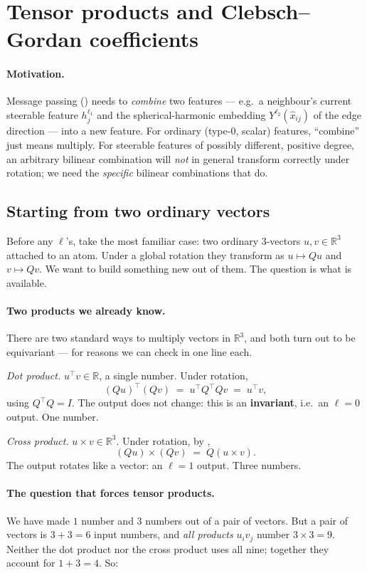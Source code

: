 \documentclass[11pt,a4paper]{report}
\theoremstyle{definition}
\theoremstyle{remark}
\newcommand{\RR}{\mathbb R}
\begin{document}
\section{Tensor products and Clebsch--Gordan coefficients}
\label{sec:cg-derivation}

\paragraph{Motivation.} Message passing () needs to
\emph{combine} two features --- e.g.\ a neighbour's current steerable
feature $h_j^{\ell_1}$ and the spherical-harmonic embedding $Y^{\ell_2}(\hat x_{ij})$
of the edge direction --- into a new feature. For ordinary (type-$0$,
scalar) features, ``combine'' just means multiply. For steerable features
of possibly different, positive degree, an arbitrary bilinear combination
will \emph{not} in general transform correctly under rotation; we need the
\emph{specific} bilinear combinations that do.

\subsection{Starting from two ordinary vectors}
\label{sec:tp-from-vectors}

Before any $\ell$'s, take the most familiar case: two ordinary $3$-vectors
$u,v\in\RR^3$ attached to an atom. Under a global rotation they transform as
$u\mapsto Qu$ and $v\mapsto Qv$. We want to build something new out of them.
The question is what is available.

\paragraph{Two products we already know.} There are two standard ways to
multiply vectors in $\RR^3$, and both turn out to be equivariant --- for
reasons we can check in one line each.

\emph{Dot product.} $u^\top v\in\RR$, a single number. Under rotation,
\[
(Qu)^\top(Qv) \;=\; u^\top Q^\top Q v \;=\; u^\top v ,
\]
using $Q^\top Q=I$. The output does not change: this is an
\textbf{invariant}, i.e.\ an $\ell=0$ output. One number.

\emph{Cross product.} $u\times v\in\RR^3$. Under rotation, by
,
\[
(Qu)\times(Qv) \;=\; Q(u\times v) .
\]
The output rotates like a vector: an $\ell=1$ output. Three numbers.

\paragraph{The question that forces tensor products.} We have made $1$
number and $3$ numbers out of a pair of vectors. But a pair of vectors is
$3+3=6$ input numbers, and \emph{all products} $u_iv_j$ number $3\times3=9$.
Neither the dot product nor the cross product uses all nine; together they
account for $1+3=4$. So:
\end{document}
